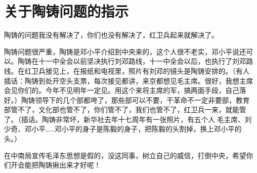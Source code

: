 \section[关于陶铸问题的指示（一九六七年一月八日）]{关于陶铸问题的指示}

陶铸的问题我没有解决了，你们也没有解决了，红卫兵起来就解决了。

陶铸问题很严重，陶铸是邓小平介绍到中央来的，这个人很不老实，邓小平说还可以。陶铸在十一中全会以前坚决执行刘邓路线，十一中全会以后，也执行了刘邓路线。在红卫兵接见上，在报纸和电视里，照片有刘邓的镜头是陶铸安排的。（有人插话：陶铸到处开空头支票，每次接见都讲，来京都想见毛主席。很好，我想主席会见你们的。今年不见明年一定见。用这个来将主席的军，搞两面手段，自己落好。）陶铸领导下的几个部都垮了，那些部可以不要，干革命不一定非要部，教育部管不了，文化部也管不了，你们管不了，我们也管不了，红卫兵一来，就能管了。（插话。陶铸非常坏，新华社去年十七周年有一张照片，有五个人毛主席、刘少奇、邓小平……邓小平的身子是陈毅的身子，把陈毅的头割掉，换上邓小平的头。）

在中南局宣传毛泽东思想是假的，没这同事，树立自己的威信，打倒中央，希望你们开会能把陶铸揪出来才好呢！

